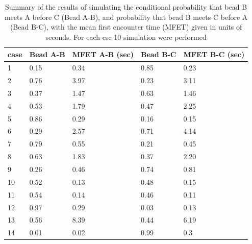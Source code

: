 \documentclass[12pt]{paper}
\begin{document}
\begin{table}[H]

\begin{tabular}{l|l|l|l|l}
case & Bead A-B & MFET A-B (sec)&Bead B-C & MFET B-C (sec)\\
 \hline
1 & 0.15 & 0.34 & 0.85 & 0.23\\
2 & 0.76 & 3.97 & 0.23 & 3.11\\
3 & 0.37 & 1.47 & 0.63 & 1.46\\
4 & 0.53 & 1.79 & 0.47 & 2.25\\
5 & 0.86 & 0.29 & 0.16 & 0.15\\
6 & 0.29 & 2.57 & 0.71 & 4.14\\
7 & 0.79 & 0.55 & 0.21 & 0.45\\
8 & 0.63 & 1.83 & 0.37 & 2.20\\
9 & 0.26 & 0.46 & 0.74 & 0.81\\
10& 0.52 & 0.13 & 0.48 & 0.15\\
11& 0.54 & 0.14 & 0.46 & 0.11\\
12& 0.97 & 0.29 & 0.03 & 0.13\\
13& 0.56 & 8.39 & 0.44 & 6.19\\
14& 0.01 & 0.02 & 0.99 & 0.3
\end{tabular}
\caption{\scriptsize{Summary of the results of simulating the conditional probability that bead B meets A before C (Bead A-B), and probability that bead B meets C before A (Bead B-C), with the mean first encounter time (MFET) given in units of seconds. For each cse 10 simulation were performed}}\label{conditionalEncouterProbabilityAndMFET}
\end{table} 
\end{document}
